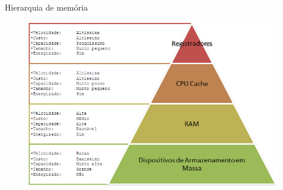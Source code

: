 \documentclass[aspectratio=169,
				xcolor=table]{beamer}
\begin{document}
		\begin{frame}{Hierarquia de memória}
			\begin{figure}[hbtp]
				\centering
				\includegraphics[height=0.8\textheight, keepaspectratio]{../figs/cap07/memoria.png}
			\end{figure}
		\end{frame}
		
\end{document}

